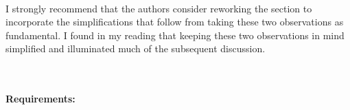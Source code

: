 \begin{enumerate}
~

I strongly recommend that the authors consider reworking the section to incorporate the simplifications that follow from taking these two observations as fundamental. I found in my reading that keeping these two observations in mind simplified and illuminated much of the subsequent discussion.

~

\end{enumerate}

\paragraph{Requirements:}

